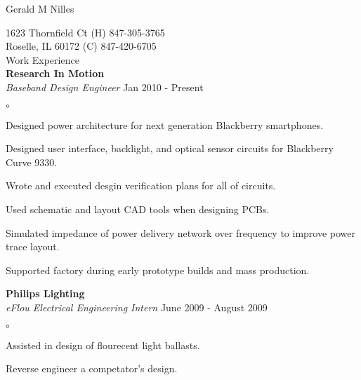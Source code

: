 \documentclass[12pt, letterpaper]{letter}
\begin{document}
\pagestyle{empty}


\newcommand{\myname}[1]{\begin{center} \Huge #1 \normalsize \\ \end{center}}
\newcommand{\myhead}[1]{\LARGE #1 \normalsize }
\newcommand{\company}[1]{\hspace*{.5cm} \textbf{#1} }
\newcommand{\position}[2]{\hspace*{.5cm} \emph{#1} \hfill #2 }
\newenvironment{skills}{\begin{list}{$\circ$}{} \setlength\parsep{0mm} \setlength\itemsep{0mm} }{\end{list}}
\newcommand{\skill}[1]{ \item #1 }

\myname{Gerald M Nilles}
1623 Thornfield Ct  \hfill (H) 847-305-3765 \\
Roselle, IL 60172   \hfill (C) 847-420-6705 \\

\myhead{Work Experience}\\
    \company{Research In Motion}\\
    \position{Baseband Design Engineer}{Jan 2010 - Present}
    \begin{skills}
        \skill{Designed power architecture for next generation Blackberry smartphones.}
        \skill{Designed user interface, backlight, and optical sensor circuits for Blackberry Curve 9330.}
        \skill{Wrote and executed desgin verification plans for all of circuits.}
        \skill{Used schematic and layout CAD tools when designing PCBs.}
        \skill{Simulated impedance of power delivery network over frequency to improve power trace layout.}
        \skill{Supported factory during early prototype builds and mass production.}
    \end{skills}

    \company{Philips Lighting} \\
    \position{eFlou Electrical Engineering Intern}{June 2009 - August 2009}
    \begin{skills}
        \skill{Assisted in design of flourecent light ballasts.}
        \skill{Reverse engineer a competator's design.}
    \end{skills}
\end{document}
